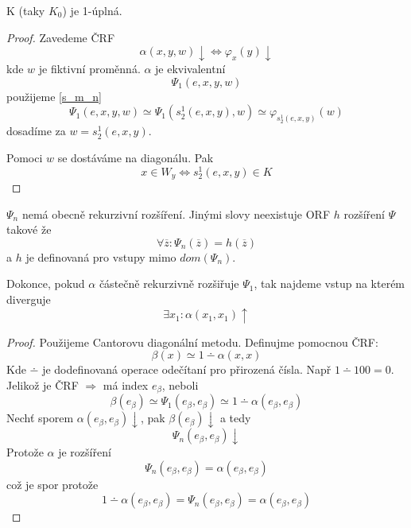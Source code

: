 \begin{theorem}[K 1-úplná]
	K (taky $K_0$) je 1-úplná.
\end{theorem}
\begin{proof}
	Zavedeme ČRF
	\[ \alpha(x, y, w) \downarrow \iff \varphi_x(y) \downarrow\]
	kde $w$ je fiktivní proměnná.
	$\alpha$ je ekvivalentní
	\[ \Psi_1(e, x, y, w) \]
	použijeme \cref{s_m_n}
	\[ \Psi_1(e, x, y, w) \simeq \Psi_1(s_2^1(e, x, y), w) \simeq \varphi_{s_2^1(e, x, y)}(w) \]
	dosadíme za $w = s_2^1(e, x, y)$.

	Pomoci $w$ se dostáváme na diagonálu. Pak
	\[ x \in W_y \iff s_2^1(e, x, y) \in K \]
\end{proof}

\begin{theorem}
	$\Psi_n$ nemá obecně rekurzivní rozšíření.
	Jinými slovy neexistuje ORF $h$ rozšíření $\Psi$ takové že
	\[ \forall \overline{z}: \Psi_n(\overline{z}) = h(\overline{z}) \]
	a $h$ je definovaná pro vstupy mimo $dom(\Psi_n)$.

	Dokonce, pokud $\alpha$ částečně rekurzivně rozšiřuje $\Psi_1$, tak najdeme vstup na kterém diverguje
	\[ \exists x_1: \alpha(x_1, x_1) \uparrow \]
\end{theorem}
\begin{proof}
	Použijeme Cantorovu diagonální metodu.
	Definujme pomocnou ČRF:
	\[ \beta(x) \simeq 1 \dotminus \alpha(x, x) \]
	Kde $\dotminus$ je dodefinovaná operace odečítaní pro přirozená čísla.
	Např $1 \dotminus 100 = 0$.
	Jelikož je ČRF $\Rightarrow$ má index $e_{\beta}$, neboli
	\[ \beta(e_{\beta}) \simeq \Psi_1(e_{\beta}, e_{\beta}) \simeq 1 \dotminus \alpha(e_{\beta}, e_{\beta}) \]
	Nechť sporem $\alpha(e_{\beta}, e_{\beta}) \downarrow$, pak $\beta(e_{\beta}) \downarrow$ a tedy
	\[ \Psi_n(e_{\beta}, e_{\beta}) \downarrow \]
	Protože $\alpha$ je rozšíření
	\[ \Psi_n(e_{\beta}, e_{\beta}) = \alpha(e_{\beta}, e_{\beta})\]
	což je spor protože
	\[ 1 \dotminus \alpha(e_{\beta}, e_{\beta}) = \Psi_n(e_{\beta}, e_{\beta}) = \alpha(e_{\beta}, e_{\beta})\]
\end{proof}
